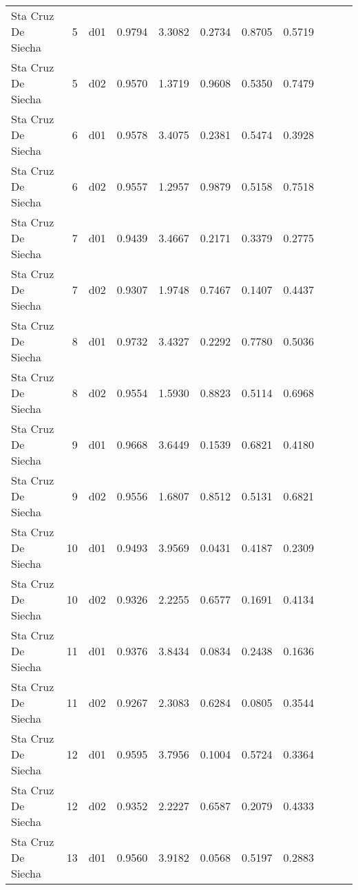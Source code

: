 \begin{landscape}
\begin{longtable}{p{2cm}rrrrrrrrrr}
   Sta Cruz De Siecha  &          5 &     d01 &   0.9794 &  3.3082 &        0.2734 &           0.8705 &  0.5719 \\
   Sta Cruz De Siecha  &          5 &     d02 &   0.9570 &  1.3719 &        0.9608 &           0.5350 &  0.7479 \\
   Sta Cruz De Siecha  &          6 &     d01 &   0.9578 &  3.4075 &        0.2381 &           0.5474 &  0.3928 \\
   Sta Cruz De Siecha  &          6 &     d02 &   0.9557 &  1.2957 &        0.9879 &           0.5158 &  0.7518 \\
   Sta Cruz De Siecha  &          7 &     d01 &   0.9439 &  3.4667 &        0.2171 &           0.3379 &  0.2775 \\
   Sta Cruz De Siecha  &          7 &     d02 &   0.9307 &  1.9748 &        0.7467 &           0.1407 &  0.4437 \\
   Sta Cruz De Siecha  &          8 &     d01 &   0.9732 &  3.4327 &        0.2292 &           0.7780 &  0.5036 \\
   Sta Cruz De Siecha  &          8 &     d02 &   0.9554 &  1.5930 &        0.8823 &           0.5114 &  0.6968 \\
   Sta Cruz De Siecha  &          9 &     d01 &   0.9668 &  3.6449 &        0.1539 &           0.6821 &  0.4180 \\
   Sta Cruz De Siecha  &          9 &     d02 &   0.9556 &  1.6807 &        0.8512 &           0.5131 &  0.6821 \\
   Sta Cruz De Siecha  &         10 &     d01 &   0.9493 &  3.9569 &        0.0431 &           0.4187 &  0.2309 \\
   Sta Cruz De Siecha  &         10 &     d02 &   0.9326 &  2.2255 &        0.6577 &           0.1691 &  0.4134 \\
   Sta Cruz De Siecha  &         11 &     d01 &   0.9376 &  3.8434 &        0.0834 &           0.2438 &  0.1636 \\
   Sta Cruz De Siecha  &         11 &     d02 &   0.9267 &  2.3083 &        0.6284 &           0.0805 &  0.3544 \\
   Sta Cruz De Siecha  &         12 &     d01 &   0.9595 &  3.7956 &        0.1004 &           0.5724 &  0.3364 \\
   Sta Cruz De Siecha  &         12 &     d02 &   0.9352 &  2.2227 &        0.6587 &           0.2079 &  0.4333 \\
   Sta Cruz De Siecha  &         13 &     d01 &   0.9560 &  3.9182 &        0.0568 &           0.5197 &  0.2883 \\

\end{longtable}
\end{landscape}
